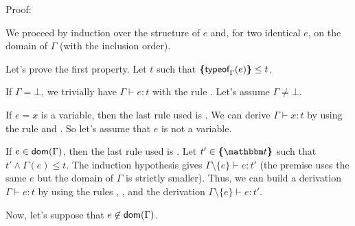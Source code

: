\documentclass[a4paper]{article}
\theoremstyle{definition}
\begin{document}
  Proof:

  We proceed by induction over the structure of $e$
  and, for two identical $e$, on the domain of $\Gamma$ (with the inclusion order).

  Let's prove the first property.
  Let $t$ such that $\textbf{\textup{\{}}\textsf{typeof}_{\Gamma}(e)\textbf{\textup{\}}} \leq t$.

  If $\Gamma = \bot$, we trivially have $\Gamma \vdash e:t$ with the rule .
  Let's assume $\Gamma \neq \bot$.

  If $e=x$ is a variable, then the last rule used is .
  We can derive $\Gamma \vdash x:t$ by using the rule  and .
  So let's assume that $e$ is not a variable.

  If $e\in\textsf{dom}(\Gamma)$, then the last rule used is .
  Let $t'\in\tsint{\ts}$ such that $t'\land\Gamma(e)\leq t$.
  The induction hypothesis gives $\Gamma\setminus\{e\} \vdash e:t'$
  (the premise uses the same $e$ but the domain of $\Gamma$ is strictly smaller).
  Thus, we can build a derivation $\Gamma \vdash e:t$ by using the rules , ,
   and the derivation $\Gamma\setminus\{e\} \vdash e:t'$.

  Now, let's suppose that $e\not\in\textsf{dom}(\Gamma)$.
\end{document}
